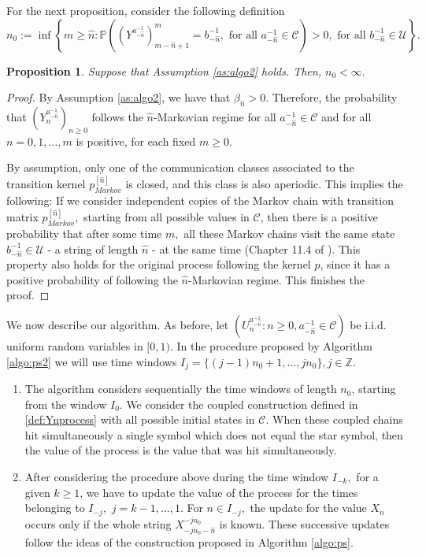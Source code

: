 \documentclass[a4paper]{article}
\newtheorem{proposition}{Proposition}%
\def\P{{\mathbb P}}
\newcommand{\Z}{\mathbb{Z}}
\begin{document}
For the next proposition, consider the following definition
$$
n_0:=\inf\left\{m\geq \hat{n}: \P\left((Y^{a_{-\hat{n}}^{-1}})^m_{m-\hat{n}+1}= b_{-\hat{n}}^{-1}, \text{ for all } a_{-\hat{n}}^{-1} \in \mathcal{C}\right)>0, \text{ for all }b_{-\hat{n}}^{-1}\in \mathcal{U} \right\}.
$$

\begin{proposition}
Suppose that Assumption \ref{as:algo2} holds. %
Then, $n_0<\infty.$
\end{proposition}
\begin{proof} 
By Assumption \ref{as:algo2}, we have that $\beta_{\hat n} >0$. Therefore, the probability that $(Y_n^{a_{-\hat n}^{-1}})_{n\geq 0}$ follows the $\hat n$-Markovian regime for all $a_{-\hat n}^{-1}\in \mathcal{C}$ and for all $n=0,1,\ldots, m$ is positive, for each fixed $m\geq 0$. 

By assumption, only one of the communication classes associated to the transition kernel $p^{[\hat n]}_{Markov}$ is closed, and this class is also aperiodic. This implies the following: If we consider independent copies of the Markov chain with transition matrix $p^{[\hat n]}_{Markov},$ starting from all possible values in $\mathcal{C}$, then there is a positive probability that after some time $m,$ all these Markov chains visit the same state $b_{-\hat n}^{-1}\in \mathcal{U}$ - a string of length $\hat n$ - at the same time (Chapter 11.4 of \cite{bremaud}). This property also holds for the original process following the kernel $p$, since it has a positive probability of following the $\hat n$-Markovian regime. This finishes the proof.  
\end{proof}

We now describe our algorithm. As before, let $(U_n^{a_{- \hat n}^{-1}}:n\geq0,a_{- \hat n}^{-1}\in \mathcal{C})$  be i.i.d. uniform random variables in $[0,1)$.
In the procedure proposed by Algorithm \ref{algo:ps2} we will use time windows $ I_j = \{ ( j-1) n_0 + 1 , \ldots,  j n_0 \} , j \in \Z. $  
\begin{enumerate}
    \item The algorithm considers sequentially the time windows of length $n_0$, starting from the window $I_0 .$ We consider the coupled construction defined in \eqref{def:Ynprocess} with all  possible initial states in $\mathcal{C}$. When these coupled chains hit simultaneously a single symbol which does not equal the star symbol, then the value of the process is the value that was hit simultaneously. 
    \item After considering the procedure above during the time window $I_{-k}, $ for a given $k\geq 1$, we have to update the value of the process for the times belonging to $ I_{-j}, $  $j=k-1,\ldots, 1$. For $n \in I_{-j}, $ the update for the value $X_{n}$ occurs only if the whole string $X_{-jn_0-\hat{n}}^{-jn_0}$ is known. These successive updates follow the ideas of the construction proposed in Algorithm \ref{algo:ps}. 
\end{enumerate}
\end{document}
